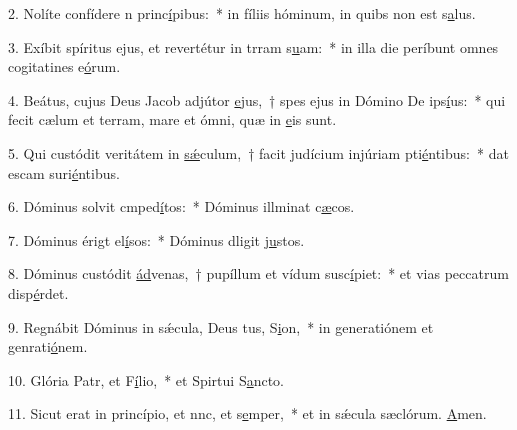 2. Nolíte confídere n princ\uline{í}pibus:~* in fíliis hóminum, in quibs non est s\uline{a}lus.\par 
3. Exíbit spíritus ejus, et revertétur in trram s\uline{u}am:~* in illa die períbunt omnes cogitatines e\uline{ó}rum.\par 
4. Beátus, cujus Deus Jacob adjútor \uline{e}jus,~† spes ejus in Dómino De ips\uline{í}us:~* qui fecit cælum et terram, mare et ómni, quæ in \uline{e}is sunt.\par 
5. Qui custódit veritátem in \uline{sǽ}culum,~† facit judícium injúriam pti\uline{é}ntibus:~* dat escam suri\uline{é}ntibus.\par 
6. Dóminus solvit cmped\uline{í}tos:~* Dóminus illminat c\uline{æ}cos.\par 
7. Dóminus érigt el\uline{í}sos:~* Dóminus dligit j\uline{u}stos.\par 
8. Dóminus custódit \uline{ád}venas,~† pupíllum et vídum susc\uline{í}piet:~* et vias peccatrum disp\uline{é}rdet.\par 
9. Regnábit Dóminus in sǽcula, Deus tus, S\uline{i}on,~* in generatiónem et genrati\uline{ó}nem.\par 
10. Glória Patr, et F\uline{í}lio,~* et Spirtui S\uline{a}ncto.\par 
11. Sicut erat in princípio, et nnc, et s\uline{e}mper,~* et in sǽcula sæclórum. \uline{A}men.\par 
